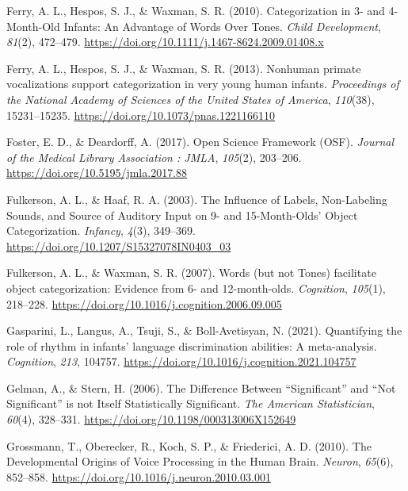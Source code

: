 \documentclass[
  man,mask,floatsintext]{apa6}
\newlength{\cslhangindent}
\newlength{\cslentryspacingunit} %
\newenvironment{CSLReferences}[2] %
 {%
  \setlength{\parindent}{0pt}
  \ifodd #1
  \let\oldpar\par
  \def\par{\hangindent=\cslhangindent\oldpar}
  \fi
  \setlength{\parskip}{#2\cslentryspacingunit}
 }%
 {}
\begin{document}
\begin{CSLReferences}{1}{0}
\leavevmode{}%
Ferry, A. L., Hespos, S. J., \& Waxman, S. R. (2010). Categorization in 3- and 4-{Month}-{Old} {Infants}: {An} {Advantage} of {Words} {Over} {Tones}. \emph{Child Development}, \emph{81}(2), 472--479. \url{https://doi.org/10.1111/j.1467-8624.2009.01408.x}

\leavevmode{}%
Ferry, A. L., Hespos, S. J., \& Waxman, S. R. (2013). Nonhuman primate vocalizations support categorization in very young human infants. \emph{Proceedings of the National Academy of Sciences of the United States of America}, \emph{110}(38), 15231--15235. \url{https://doi.org/10.1073/pnas.1221166110}

\leavevmode{}%
Foster, E. D., \& Deardorff, A. (2017). Open {Science} {Framework} ({OSF}). \emph{Journal of the Medical Library Association : JMLA}, \emph{105}(2), 203--206. \url{https://doi.org/10.5195/jmla.2017.88}

\leavevmode{}%
Fulkerson, A. L., \& Haaf, R. A. (2003). The {Influence} of {Labels}, {Non}-{Labeling} {Sounds}, and {Source} of {Auditory} {Input} on 9- and 15-{Month}-{Olds}' {Object} {Categorization}. \emph{Infancy}, \emph{4}(3), 349--369. \url{https://doi.org/10.1207/S15327078IN0403_03}

\leavevmode{}%
Fulkerson, A. L., \& Waxman, S. R. (2007). Words (but not {Tones}) facilitate object categorization: {Evidence} from 6- and 12-month-olds. \emph{Cognition}, \emph{105}(1), 218--228. \url{https://doi.org/10.1016/j.cognition.2006.09.005}

\leavevmode{}%
Gasparini, L., Langus, A., Tsuji, S., \& Boll-Avetisyan, N. (2021). Quantifying the role of rhythm in infants' language discrimination abilities: {A} meta-analysis. \emph{Cognition}, \emph{213}, 104757. \url{https://doi.org/10.1016/j.cognition.2021.104757}

\leavevmode{}%
Gelman, A., \& Stern, H. (2006). The {Difference} {Between} {``{Significant}''} and {``{Not} {Significant}''} is not {Itself} {Statistically} {Significant}. \emph{The American Statistician}, \emph{60}(4), 328--331. \url{https://doi.org/10.1198/000313006X152649}

\leavevmode{}%
Grossmann, T., Oberecker, R., Koch, S. P., \& Friederici, A. D. (2010). The {Developmental} {Origins} of {Voice} {Processing} in the {Human} {Brain}. \emph{Neuron}, \emph{65}(6), 852--858. \url{https://doi.org/10.1016/j.neuron.2010.03.001}


\end{CSLReferences}
\end{document}
